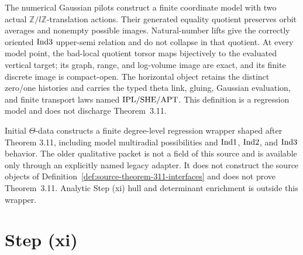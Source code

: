 \begin{definition}
  \label{def:constructed-m3-procession}
  \leanok
  The numerical Gaussian pilots construct a finite coordinate model with two
  actual \(\mathbb Z/l\mathbb Z\)-translation actions.  Their generated
  equality quotient preserves orbit averages and nonempty possible images.
  Natural-number lifts give the correctly oriented \(\mathrm{Ind3}\) upper-semi
  relation and do not collapse in that quotient. At every model point,
  the bad-local quotient torsor maps bijectively to the evaluated vertical
  target; its graph, range, and log-volume image are exact, and its finite
  discrete image is compact-open.  The horizontal object retains the distinct
  zero/one histories and carries the typed theta link, gluing, Gaussian
  evaluation, and finite transport laws named \(\mathrm{IPL}/\mathrm{SHE}/\mathrm{APT}\). This
  definition is a regression model and does not discharge Theorem~3.11.
\end{definition}

\begin{theorem}
  \label{thm:theorem-311-source-output}
  \leanok
  Initial \(\Theta\)-data constructs a finite degree-level regression wrapper
  shaped after Theorem 3.11, including model multiradial possibilities and
  \(\mathrm{Ind1}\), \(\mathrm{Ind2}\), and \(\mathrm{Ind3}\) behavior.  The older qualitative
  packet is not a field of this source and is available only through an
  explicitly named legacy adapter.  It does not construct the source objects
  of Definition~\ref{def:source-theorem-311-interfaces} and does not prove
  Theorem~3.11.  Analytic Step (xi) hull and determinant enrichment is outside
  this wrapper.
\end{theorem}

\section{Step (xi)}

